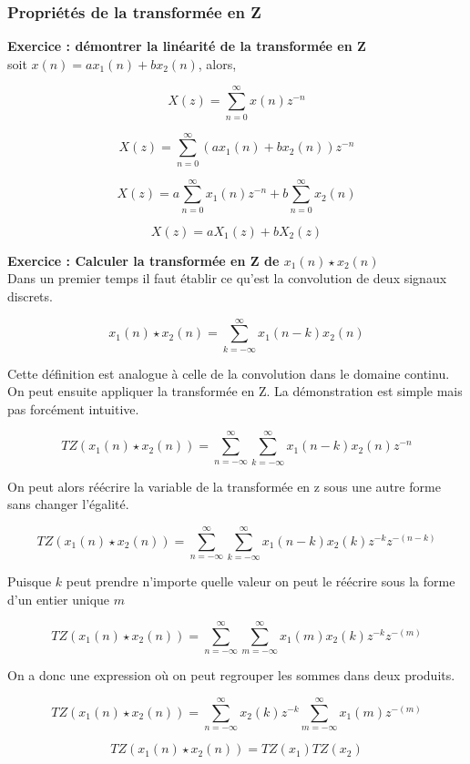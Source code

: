 \documentclass[11pt,a4paper]{article}
\begin{document}
\subsubsection{Propriétés de la transformée en Z}

\textbf{Exercice : démontrer la linéarité de la transformée en Z}\\

soit $x(n) = a x_1(n) + b x_2(n)$, alors,

\[X(z) = \sum_{n = 0}^{\infty} x(n) z^{-n}\] 

\[X(z) = \sum_{n = 0}^{\infty} (a x_1(n) + b x_2(n)) z^{-n}\] 

\[X(z) = a \sum_{n = 0}^{\infty} x_1(n)  z^{-n} + b \sum_{n = 0}^{\infty} x_2(n) \] 

\[X(z) = a X_1(z)+ b X_2(z) \] 

\textbf{Exercice : Calculer la transformée en Z de $x_1(n) \star x_2(n)$}\\

Dans un premier temps il faut établir ce qu'est la convolution  de deux signaux discrets.

\[ x_1(n) \star x_2(n)=  \sum_{k = -\infty}^{\infty} x_1(n-k)x_2(n) \]

Cette définition est analogue à celle de la convolution dans le domaine continu. On peut ensuite appliquer la transformée en Z. La démonstration est simple mais pas forcément intuitive.

\[ TZ(x_1(n) \star x_2(n)) = \sum_{n = -\infty}^{\infty} \sum_{k = -\infty}^{\infty} x_1(n-k)x_2(n) z^{-n}\]

On peut alors réécrire la variable de la transformée en z sous une autre forme sans changer l'égalité.

\[ TZ(x_1(n) \star x_2(n)) = \sum_{n = -\infty}^{\infty} \sum_{k = -\infty}^{\infty} x_1(n-k)x_2(k) z^{-k}  z^{-(n-k)}\]

Puisque $k$ peut prendre n'importe quelle valeur on peut le réécrire sous la forme d'un entier unique $m$ 

\[ TZ(x_1(n) \star x_2(n)) = \sum_{n = -\infty}^{\infty} \sum_{m = -\infty}^{\infty} x_1(m)x_2(k) z^{-k}  z^{-(m)}\]

On a donc une expression où on peut regrouper les sommes dans deux produits.

\[ TZ(x_1(n) \star x_2(n)) = \sum_{n = -\infty}^{\infty} x_2(k)z^{-k} \sum_{m = -\infty}^{\infty} x_1(m)   z^{-(m)}\]

\[ TZ(x_1(n) \star x_2(n)) = TZ(x_1) TZ(x_2)\]
\end{document}
